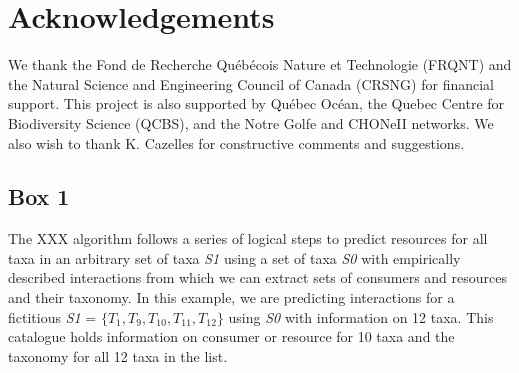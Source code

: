 \documentclass[letterpaper]{article}
\begin{document}
\section{Acknowledgements}
We thank the Fond de Recherche Québécois Nature et Technologie (FRQNT) and the Natural Science and Engineering Council of Canada (CRSNG) for financial support. This project is also supported by Québec Océan, the Quebec Centre for Biodiversity Science (QCBS), and the Notre Golfe and CHONeII networks. We also wish to thank K. Cazelles for constructive comments and suggestions.

\newpage
\subsection{Box 1}
The XXX algorithm follows a series of logical steps to predict resources for all taxa in an arbitrary set of taxa \textit{S1} using a set of taxa \textit{S0} with empirically described interactions from which we can extract sets of consumers and resources and their taxonomy. In this example, we are predicting interactions for a fictitious \textit{S1}
 = $\{T_1, T_9, T_{10},T_{11}, T_{12}\}$ using \textit{S0} with information on 12 taxa. This catalogue holds information on consumer or resource for 10 taxa and the taxonomy for all 12 taxa in the list.
\end{document}

